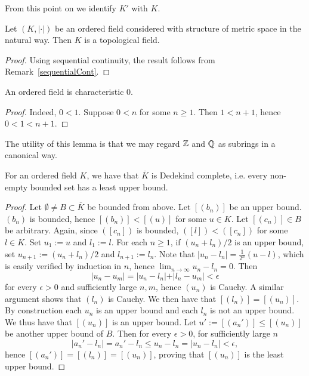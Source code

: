     \begin{remark}
        From this point on we identify $K'$ with $K$.
    \end{remark}
    \begin{lemma}
        Let $(K,\vert \cdot \vert)$ be an ordered field considered with structure of metric space in the natural way. Then $K$ is a topological field.
    \end{lemma}
    \begin{proof}
        Using sequential continuity, the result follows from Remark~\ref{sequentialCont}.
    \end{proof}
    \begin{lemma}
        An ordered field is characteristic $0$.
    \end{lemma}
    \begin{proof}
        Indeed, $0<1$. Suppose $0<n$ for some $n\geq 1$. Then $1<n+1$, hence $0<1<n+1$.
    \end{proof}
    \begin{remark}
        The utility of this lemma is that we may regard $\mathbb{Z}$ and $\mathbb{Q}$ as subrings in a canonical way.
    \end{remark}
    \begin{proposition}
        For an ordered field $K$, we have that $\overline{K}$ is Dedekind complete, i.e. every non-empty bounded set has a least upper bound.
    \end{proposition}
    \begin{proof}
        Let $\emptyset\neq B\subset \overline{K}$ be bounded from above. Let $[(b_n)]$ be an upper bound. $(b_n)$ is bounded, hence $[(b_n)]<[(u)]$ for some $u\in K$. Let $[(c_n)]\in B$ be arbitrary. Again, since $([c_n])$ is bounded, $([l])<([c_n])$ for some $l\in K$. Set $u_1 :=u$ and $l_1:=l$. For each $n\geq 1$, if $(u_n+l_n)/2$ is an upper bound, set $u_{n+1}:= (u_n+l_n)/2$ and $l_{n+1} := l_n$. Note that $\vert u_n-l_n\vert = \frac{1}{2^n}(u -l)$, which is easily verified by induction in $n$, hence $\lim_{n\to \infty} u_n-l_n = 0$. Then 
        $$\vert u_n - u_m\vert = \vert u_n-l_n\vert + \vert l_n-u_m\vert < \epsilon$$
        for every $\epsilon>0$ and sufficiently large $n,m$, hence $(u_n)$ is Cauchy. A similar argument shows that $(l_n)$ is Cauchy. We then have that $[(l_n)]=[(u_n)]$. By construction each $u_n$ is an upper bound and each $l_n$ is not an upper bound. We thus have that $[(u_n)]$ is an upper bound. Let $u':=[(a_n')]\leq [(u_n)]$ be another upper bound of $B$. Then for every $\epsilon>0$, for sufficiently large $n$
        $$\vert a_n'-l_n\vert = a_n'-l_n \leq u_n-l_n= \vert u_n-l_n\vert <\epsilon,$$
        hence $[(a_n')]=[(l_n)]=[(u_n)]$, proving that $[(u_n)]$ is the least upper bound.
    \end{proof}
